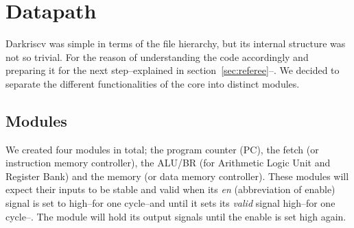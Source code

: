 \section{Datapath}
\label{sec:datapath}

Darkriscv was simple in terms of the file hierarchy, but its internal structure
was not so trivial. For the reason of understanding the code accordingly and
preparing it for the next step--explained in section~\ref{sec:referee}--. We decided to
separate the different functionalities of the core into distinct modules.

\subsection{Modules}

We created four modules in total; the program counter (PC), the fetch (or
instruction memory controller), the ALU/BR (for Arithmetic Logic Unit and
Register Bank) and the memory (or data memory controller). These modules will
expect their inputs to be stable and valid when its \textit{en} (abbreviation of
enable) signal is set to high--for one cycle--and until it sets its \textit{valid}
signal high--for one cycle--. The module will hold its output signals until the
enable is set high again.


